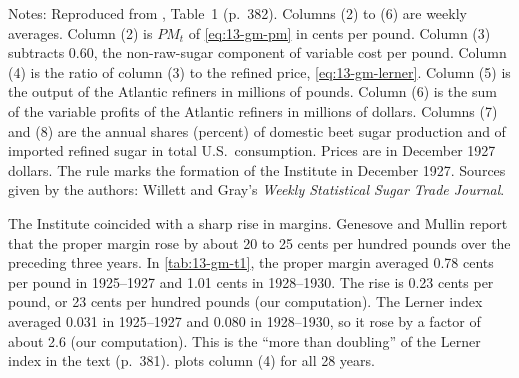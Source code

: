 \begin{table}[htbp]
\smallskip
\begin{minipage}{0.95\textwidth}\footnotesize
Notes: Reproduced from \citet{GenesoveMullin2001}, Table~1 (p.~382). Columns (2) to (6) are weekly averages.
Column (2) is $\mathit{PM}_t$ of \eqref{eq:13-gm-pm} in cents per pound. Column (3) subtracts 0.60, the
non-raw-sugar component of variable cost per pound. Column (4) is the ratio of column (3) to the refined price,
\eqref{eq:13-gm-lerner}. Column (5) is the output of the Atlantic refiners in millions of pounds. Column (6) is the
sum of the variable profits of the Atlantic refiners in millions of dollars. Columns (7) and (8) are the annual
shares (percent) of domestic beet sugar production and of imported refined sugar in total U.S.\ consumption.
Prices are in December 1927 dollars. The rule marks the formation of the Institute in December 1927. Sources
given by the authors: Willett and Gray's \textit{Weekly Statistical Sugar Trade Journal}.
\end{minipage}
\end{table}

The Institute coincided with a sharp rise in margins. Genesove and Mullin report that the proper margin rose by
about 20 to 25 cents per hundred pounds over the preceding three years. In \cref{tab:13-gm-t1}, the proper margin
averaged 0.78 cents per pound in 1925--1927 and 1.01 cents in 1928--1930. The rise is 0.23 cents per pound, or 23
cents per hundred pounds (our computation). The Lerner index averaged 0.031 in 1925--1927 and 0.080 in
1928--1930, so it rose by a factor of about 2.6 (our computation). This is the ``more than doubling'' of the
Lerner index in the text (p.~381).  plots column (4) for all 28 years.

